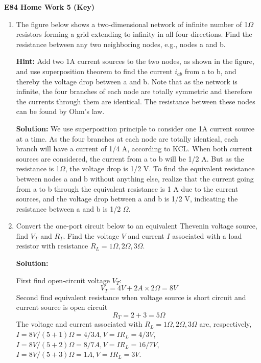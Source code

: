 \usepackage{html}

\begin{center}
{\Large \bf E84 Home Work 5 (Key)}
\end{center}
\begin{enumerate}

\item The figure below shows a two-dimensional network of infinite number 
of 1$\Omega$ resistors forming a grid extending to infinity in all four 
directions. Find the resistance between any two neighboring nodes, e.g., 
nodes a and b.


{\bf Hint:} Add two 1A current sources to the two nodes, as shown in the 
figure, and use superposition theorem to find the current $i_{ab}$ from 
a to b, and thereby the voltage drop between a and b. Note that as the
network is infinite, the four branches of each node are totally symmetric
and therefore the currents through them are identical. The resistance 
between these nodes can be found by Ohm's law.

{\bf Solution:}
We use superposition principle to consider one 1A current source at a time.
As the four branches at each node are totally identical, each branch will
have a current of 1/4 A, according to KCL. When both current sources are
considered, the current from a to b will be 1/2 A. But as the resistance
is 1$\Omega$, the voltage drop is 1/2 V. To find the equivalent resistance
between nodes a and b without anything else, realize that the current going
from a to b through the equivalent resistance is 1 A due to the current 
sources, and the voltage drop between a and b is 1/2 V, indicating the 
resistance between a and b is 1/2 $\Omega$.

\item Convert the one-port circuit below to an equivalent Thevenin voltage
source, find $V_T$ and $R_T$. Find the voltage $V$ and current $I$ associated
with a load resistor with resistance $R_L=1\Omega, 2\Omega, 3\Omega$.


{\bf Solution:}

First find open-circuit voltage $V_T$:
\[ V_T=4V+2A \times 2\Omega = 8V \]
Second find equivalent resistance when voltage source is short circuit
and current source is open circuit
\[ R_T=2+3=5\Omega \]
The voltage and current associated with $R_L=1\Omega, 2\Omega, 3\Omega$ are, 
respectively, 
$I=8V/(5+1)\Omega=4/3A, V=IR_L=4/3V$, 
$I=8V/(5+2)\Omega=8/7A, V=IR_L=16/7V$, 
$I=8V/(5+3)\Omega=1A, V=IR_L=3V$.


\end{enumerate}

